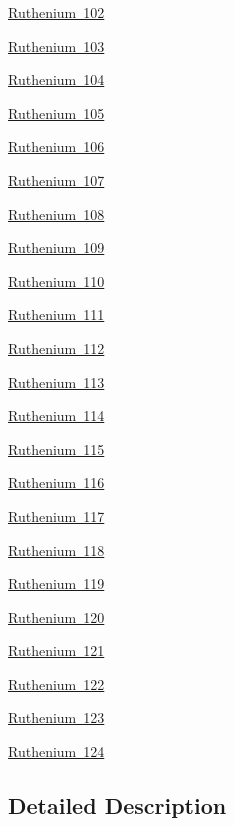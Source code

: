 \begin{DoxyCompactItemize}
\mbox{\hyperlink{group___isotope_const-_ruthenium-_ru102}{Ruthenium 102}}
\item 
\mbox{\hyperlink{group___isotope_const-_ruthenium-_ru103}{Ruthenium 103}}
\item 
\mbox{\hyperlink{group___isotope_const-_ruthenium-_ru104}{Ruthenium 104}}
\item 
\mbox{\hyperlink{group___isotope_const-_ruthenium-_ru105}{Ruthenium 105}}
\item 
\mbox{\hyperlink{group___isotope_const-_ruthenium-_ru106}{Ruthenium 106}}
\item 
\mbox{\hyperlink{group___isotope_const-_ruthenium-_ru107}{Ruthenium 107}}
\item 
\mbox{\hyperlink{group___isotope_const-_ruthenium-_ru108}{Ruthenium 108}}
\item 
\mbox{\hyperlink{group___isotope_const-_ruthenium-_ru109}{Ruthenium 109}}
\item 
\mbox{\hyperlink{group___isotope_const-_ruthenium-_ru110}{Ruthenium 110}}
\item 
\mbox{\hyperlink{group___isotope_const-_ruthenium-_ru111}{Ruthenium 111}}
\item 
\mbox{\hyperlink{group___isotope_const-_ruthenium-_ru112}{Ruthenium 112}}
\item 
\mbox{\hyperlink{group___isotope_const-_ruthenium-_ru113}{Ruthenium 113}}
\item 
\mbox{\hyperlink{group___isotope_const-_ruthenium-_ru114}{Ruthenium 114}}
\item 
\mbox{\hyperlink{group___isotope_const-_ruthenium-_ru115}{Ruthenium 115}}
\item 
\mbox{\hyperlink{group___isotope_const-_ruthenium-_ru116}{Ruthenium 116}}
\item 
\mbox{\hyperlink{group___isotope_const-_ruthenium-_ru117}{Ruthenium 117}}
\item 
\mbox{\hyperlink{group___isotope_const-_ruthenium-_ru118}{Ruthenium 118}}
\item 
\mbox{\hyperlink{group___isotope_const-_ruthenium-_ru119}{Ruthenium 119}}
\item 
\mbox{\hyperlink{group___isotope_const-_ruthenium-_ru120}{Ruthenium 120}}
\item 
\mbox{\hyperlink{group___isotope_const-_ruthenium-_ru121}{Ruthenium 121}}
\item 
\mbox{\hyperlink{group___isotope_const-_ruthenium-_ru122}{Ruthenium 122}}
\item 
\mbox{\hyperlink{group___isotope_const-_ruthenium-_ru123}{Ruthenium 123}}
\item 
\mbox{\hyperlink{group___isotope_const-_ruthenium-_ru124}{Ruthenium 124}}
\end{DoxyCompactItemize}


\subsection{Detailed Description}
